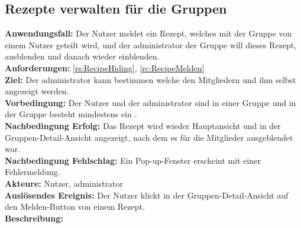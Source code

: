 \documentclass[parskip=full]{scrartcl}
\begin{document}
\subsection{Rezepte verwalten für die Gruppen}
\textbf{Anwendungsfall:} Der Nutzer meldet ein Rezept, welches mit der Gruppe von einem Nutzer geteilt wird, und der \Gls{administrator} der Gruppe will dieses Rezept, \gls{ausblenden} und danach wieder \gls{einblenden}.\\
\textbf{Anforderungen:} \ref{rs:RecipeHiding}, \ref{rc:RecipeMelden}\\
\textbf{Ziel:} Der \Gls{administrator} kann bestimmen welche  den Mitgliedern und ihm selbst angezeigt werden.\\
\textbf{Vorbedingung:} Der Nutzer und der \Gls{administrator} sind in einer Gruppe und in der Gruppe besteht mindestens ein .\\
\textbf{Nachbedingung Erfolg:} Das Rezept wird wieder Hauptansicht und in der Gruppen-Detail-Ansicht angezeigt, nach dem es für die Mitglieder ausgeblendet war.\\
\textbf{Nachbedingung Fehlschlag:} Ein Pop-up-Fenster erscheint mit einer Fehlermeldung.\\
\textbf{Akteure:} Nutzer, \Gls{administrator}\\
\textbf{Auslösendes Ereignis:} Der Nutzer klickt in der Gruppen-Detail-Ansicht auf den Melden-Button von einem Rezept.\\
\textbf{Beschreibung:}
\end{document}
